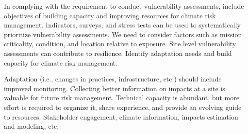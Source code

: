 \documentclass[10pt]{amsart}
\begin{document}
In complying with the requirement to conduct vulnerability assessments, include objectives of building capacity and improving resources for climate risk management.
Indicators, surveys, and stress tests can be used to systematically prioritize vulnerability assessments.
We need to consider factors such as mission criticality, condition, and location relative to exposure.
Site level vulnerability assessments can contribute to resilience.
Identify adaptation needs and build capacity for climate risk management.

Adaptation (i.e., changes in practices, infrastructure, etc.) should include improved monitoring.
Collecting better information on impacts at a site is valuable for future risk management.
Technical capacity is abundant, but more effort is required to organize it, share experience, and provide an evolving guide to resources.
Stakeholder engagement, climate information, impacts estimation and modeling, etc.



\newpage
\printbibliography
\end{document}
